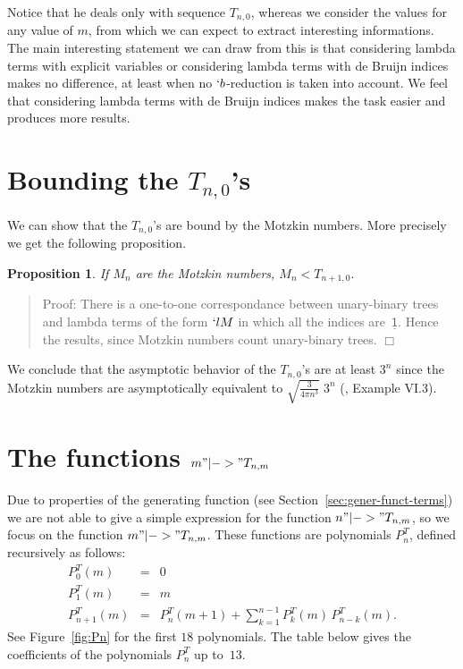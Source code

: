 \documentclass[preprint,authoryear]{elsarticle}
\newenvironment{proof}[1]{\begin{quotation}\noindent\textsf{Proof:} #1}{\(\Box\)\end{quotation}}
\newtheorem{prop}{Proposition}
\newcommand{\Var}[1]{\underline{\mathsf{#1}}}
\begin{document}
Notice that he deals only with sequence $T_{n,0}$, whereas we consider the values for any
value of $m$, from which we can expect to extract interesting informations.  The main
interesting statement we can draw from this is that considering lambda terms with explicit
variables or considering lambda terms with de Bruijn indices makes no difference, at least
when no $`b$-reduction is taken into account.  We
feel that considering lambda terms with de Bruijn indices makes the task easier and
produces more results.

\section{Bounding the $T_{n,0}$'s}
\label{sec:bounding-t_0-m}

We can show that the $T_{n,0}$'s are bound by the Motzkin numbers.
More precisely we get the following proposition.
\begin{prop} 
If $M_n$ are the Motzkin numbers,
  \(M_n < T_{n+1,0}.\)
\end{prop}
\begin{proof}{}
  There is a one-to-one correspondance between unary-binary trees and lambda terms of the
  form $`l M$ in which all the indices are~$\Var{1}$.  Hence the results, since Motzkin
  numbers count unary-binary trees.
\end{proof}
We conclude that the asymptotic behavior of the $T_{n,0}$'s are at least $3^n$ since the
Motzkin numbers are asymptotically equivalent to $\sqrt{\frac{3}{4 \pi n^3}}\;3^n$
(\cite{flajolet08:_analy_combin}, Example VI.3).  


\section{The functions $m"|->" T_{n,m}$}
\label{sec:m-Tnm}

Due to properties of the generating function (see Section~\ref{sec:gener-funct-terms}) we
are not able to give a simple expression for the function $n"|->" T_{n,m}$, so we focus on
the function $m "|->" T_{n,m}$.  These functions are
polynomials $P^T_n$, defined recursively as follows:
\pagebreak[2]
\begin{eqnarray}
  P^T_0 (m) &=& 0 \label{eq:a}\\
  P^T_1(m) &=& m\\
  P^T_{n+1}(m) &=& P^T_{n}(m+1) + \sum_{k=1}^{n-1} P^T_{k}(m)\, P^T_{n-k}(m). \label{eq:c}
\end{eqnarray}
See Figure~\ref{fig:Pn} for the first $18$ polynomials.  
 The table below gives
the coefficients of the polynomials $P^T_{n}$ up to~$13$.
\end{document}

